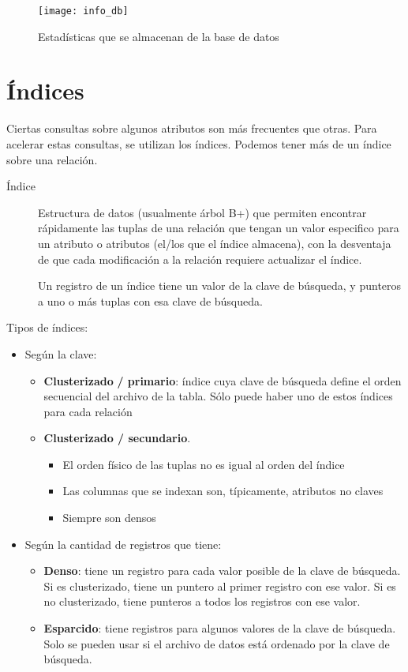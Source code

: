 \documentclass[a4paper, twoside]{article}
\newcommand{\codedir}{../resources/code} %
\begin{document}
\begin{figure}[H]
	\centering
	\texttt{[image: info\_db]}
	\caption{Estadísticas que se almacenan de la base de datos}
\end{figure}

\section{Índices}
Ciertas consultas sobre algunos atributos son más frecuentes que otras. Para acelerar estas consultas, se utilizan los índices. Podemos tener más de un índice sobre una relación.

\begin{description}
\item[Índice] Estructura de datos (usualmente árbol B+) que permiten encontrar rápidamente las tuplas de una relación que tengan un valor especifico para un atributo o atributos (el/los que el índice almacena), con la desventaja de que cada modificación a la relación requiere actualizar el índice.

Un registro de un índice tiene un valor de la clave de búsqueda, y punteros a uno o más tuplas con esa clave de búsqueda.
\end{description}



Tipos de índices:
\begin{itemize}
	\item Según la clave:
	\begin{itemize}
		\item \textbf{Clusterizado} \textbf{/ primario}: índice cuya clave de búsqueda define el orden secuencial del archivo de la tabla. Sólo puede haber uno de estos índices para cada relación
		\item \textbf{Clusterizado / secundario}.
		\begin{itemize}
			\item El orden físico de las tuplas no es igual al orden del índice
			\item Las columnas que se indexan son, típicamente, atributos no claves
			\item Siempre son densos
		\end{itemize}
	\end{itemize}

	\item Según la cantidad de registros que tiene:
	\begin{itemize}
		\item \textbf{Denso}: tiene un registro para cada valor posible de la clave de búsqueda. Si es clusterizado, tiene un puntero al primer registro con ese valor. Si es no clusterizado, tiene punteros a todos los registros con ese valor.
		\item \textbf{Esparcido}: tiene registros para algunos valores de la clave de búsqueda. Solo se pueden usar si el archivo de datos está ordenado por la clave de búsqueda.
	\end{itemize}
\end{itemize}
\end{document}
